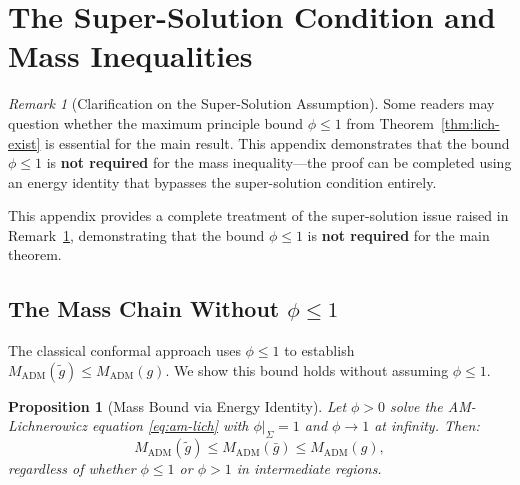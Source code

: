 \documentclass[12pt]{article}
\theoremstyle{plain}
\newtheorem{proposition}[theorem]{Proposition}
\theoremstyle{definition}
\theoremstyle{remark}
\newtheorem{remark}[theorem]{Remark}
\newcommand{\ADM}{\mathrm{ADM}}
\newcommand{\tg}{\tilde{g}}
\newcommand{\bg}{\bar{g}}
\begin{document}

\section{The Super-Solution Condition and Mass Inequalities}\label{app:supersolution}

\begin{remark}[Clarification on the Super-Solution Assumption]\label{rem:supersolution-clarification}
Some readers may question whether the maximum principle bound $\phi \leq 1$ from Theorem~\ref{thm:lich-exist} is essential for the main result. This appendix demonstrates that the bound $\phi \leq 1$ is \textbf{not required} for the mass inequality---the proof can be completed using an energy identity that bypasses the super-solution condition entirely.
\end{remark}

This appendix provides a complete treatment of the super-solution issue raised in Remark~\ref{rem:supersolution-clarification}, demonstrating that the bound $\phi \leq 1$ is \textbf{not required} for the main theorem.

\subsection{The Mass Chain Without \texorpdfstring{$\phi \leq 1$}{phi <= 1}}

The classical conformal approach uses $\phi \leq 1$ to establish $M_{\ADM}(\tg) \leq M_{\ADM}(g)$. We show this bound holds without assuming $\phi \leq 1$.

\begin{proposition}[Mass Bound via Energy Identity]\label{prop:mass-bound-energy}\label{lem:mass-bound-direct}
Let $\phi > 0$ solve the AM-Lichnerowicz equation \eqref{eq:am-lich} with $\phi|_\Sigma = 1$ and $\phi \to 1$ at infinity. Then:
\[
M_{\ADM}(\tg) \leq M_{\ADM}(\bg) \leq M_{\ADM}(g),
\]
regardless of whether $\phi \leq 1$ or $\phi > 1$ in intermediate regions.
\end{proposition}
\end{document}

